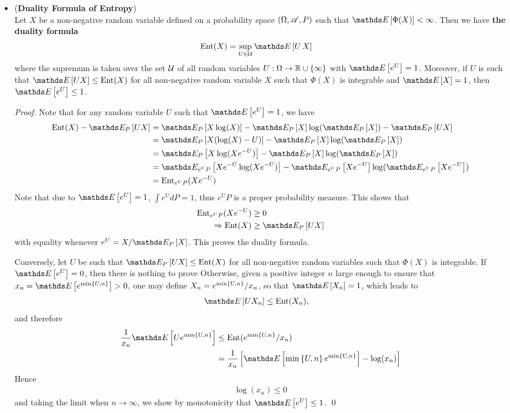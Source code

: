 \documentclass[11pt]{article}
\begin{document}
\begin{itemize}
\item \begin{theorem}(\textbf{Duality Formula of Entropy}) \citep{boucheron2013concentration}\\
Let $X$ be a non-negative random variable defined on a probability space $(\Omega, {\mathscr A}, P)$ such that $\E{}{\Phi(X)} < \infty$. Then we have \textbf{the duality formula}
\begin{align}
\text{Ent}(X) &= \sup_{U \in \cU}\E{}{U\,X}  \label{eqn: duality_entropy}
\end{align} where the supremum is taken over the set ${\mathcal U}$ of all random variables $U: \Omega \to {\mathbb R} \cup \left\{\infty\right\}$ with $\E{}{e^{U}} = 1$. Moreover, if $U$ is such that $\E{}{U X} \le \text{Ent}(X)$ for all non-negative random variable $X$ such that $\Phi(X)$ is integrable and $\E{}{X} = 1$, then $\E{}{e^{U}} \le 1$. 
\end{theorem}
\begin{proof}
Note that for any random variable $U$ such that $\E{}{e^{U}} = 1$, we have
\begin{align*}
\text{Ent}(X) - \E{P}{UX} &= \E{P}{X\log(X)} - \E{P}{X}\log(\E{P}{X}) - \E{P}{UX}\\
&= \E{P}{X(\log(X) - U)}  - \E{P}{X}\log(\E{P}{X}) \\
&= \E{P}{X\log(Xe^{-U})} - \E{P}{X}\log(\E{P}{X})\\
&= \E{e^{U}P}{Xe^{-U}\log(Xe^{-U})} - \E{e^{U}P}{Xe^{-U}}\log(\E{e^{U}P}{Xe^{-U}}) \\
&= \text{Ent}_{e^{U}P}(Xe^{-U})
\end{align*} Note that due to $\E{}{e^{U}} = 1$, $\int e^{U}dP = 1$, thus $e^{U}P$ is a proper probability measure. This shows that
\begin{align*}
\text{Ent}_{e^{U}P}(Xe^{-U}) &\ge 0\\
\Rightarrow \text{Ent}(X) &\ge \E{P}{UX}
\end{align*}  with equality whenever $e^U = X/\E{P}{X}$. This proves the duality formula. 

Conversely, let $U$ be such that $\E{P}{UX} \le \text{Ent}(X)$ for all non-negative random variables such that $\Phi(X)$ is integrable. If $\E{}{e^{U}} = 0$, then there is nothing to prove Otherwise, given a positive integer $n$ large enough to ensure that $x_n = \E{}{e^{\min\set{U, n}}} >0$, one may define $X_n = e^{\min\left\{U, n\right\}}/x_n$, so that $\E{}{X_n} = 1$, which leads to 
\begin{align*}
\E{}{UX_n} &\le  \text{Ent}(X_n),
\end{align*} and therefore
\begin{align*}
\frac{1}{x_n}\E{}{U e^{\min\set{U, n}}} &\le \text{Ent}(e^{\min\set{U, n}}/x_n)\\
&= \frac{1}{x_n}\brac{\E{}{\min\set{U, n} e^{\min\set{U, n}} }  - \log(x_n)} 
\end{align*} Hence 
\begin{align*}
\log(x_n) \le 0
\end{align*} and taking the limit when $n\to \infty$, we show by monotonicity that $\E{}{e^{U}} \le 1$. \qed
\end{proof}


\end{itemize}
\end{document}
